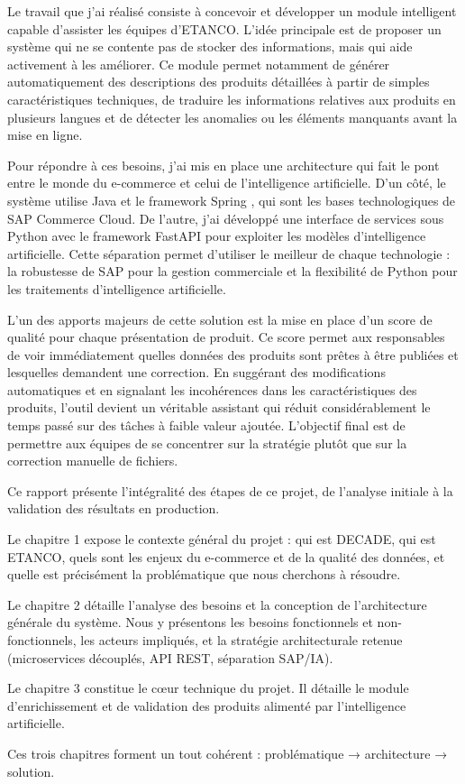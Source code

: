Le travail que j'ai réalisé consiste à concevoir et développer un module intelligent capable d'assister les équipes d'ETANCO. L'idée principale est de proposer un système qui ne se contente pas de stocker des informations, mais qui aide activement à les améliorer. Ce module permet notamment de générer automatiquement des descriptions des produits détaillées à partir de simples caractéristiques techniques, de traduire les informations relatives aux produits en plusieurs langues et de détecter les anomalies ou les éléments manquants avant la mise en ligne.

Pour répondre à ces besoins, j'ai mis en place une architecture qui fait le pont entre le monde du e-commerce et celui de l'intelligence artificielle. D'un côté, le système utilise Java et le framework Spring , qui sont les bases technologiques de SAP Commerce Cloud. De l'autre, j'ai développé une interface de services sous Python  avec le framework FastAPI  pour exploiter les modèles d'intelligence artificielle. Cette séparation permet d'utiliser le meilleur de chaque technologie : la robustesse de SAP pour la gestion commerciale et la flexibilité de Python pour les traitements d'intelligence artificielle.

L'un des apports majeurs de cette solution est la mise en place d'un score de qualité pour chaque présentation de produit. Ce score permet aux responsables de voir immédiatement quelles données des produits sont prêtes à être publiées et lesquelles demandent une correction. En suggérant des modifications automatiques et en signalant les incohérences dans les caractéristiques des produits, l'outil devient un véritable assistant qui réduit considérablement le temps passé sur des tâches à faible valeur ajoutée. L'objectif final est de permettre aux équipes de se concentrer sur la stratégie plutôt que sur la correction manuelle de fichiers.

Ce rapport présente l'intégralité des étapes de ce projet, de l'analyse initiale à la validation des résultats en production.

Le chapitre 1 expose le contexte général du projet : qui est DECADE, qui est ETANCO, quels sont les enjeux du e-commerce et de la qualité des données, et quelle est précisément la problématique que nous cherchons à résoudre.

Le chapitre 2 détaille l'analyse des besoins et la conception de l'architecture générale du système. Nous y présentons les besoins fonctionnels et non-fonctionnels, les acteurs impliqués, et la stratégie architecturale retenue (microservices découplés, API REST, séparation SAP/IA).

Le chapitre 3 constitue le cœur technique du projet. Il détaille le module d'enrichissement et de validation des produits alimenté par l'intelligence artificielle. 

Ces trois chapitres forment un tout cohérent :
problématique → architecture → solution.